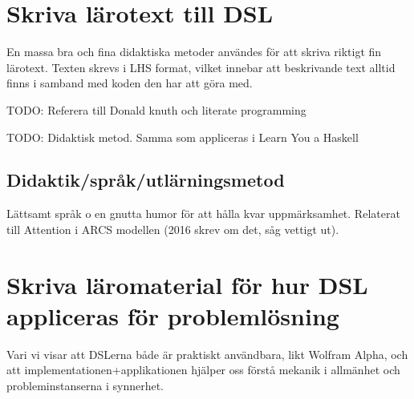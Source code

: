 \begin{binge}
  \section{Skriva lärotext till DSL}

  En massa bra och fina didaktiska metoder användes för att skriva
  riktigt fin lärotext. Texten skrevs i LHS format, vilket innebar att
  beskrivande text alltid finns i samband med koden den har att göra
  med.

  TODO: Referera till Donald knuth och literate programming

  TODO: Didaktisk metod. Samma som appliceras i Learn You a Haskell

  \subsection{Didaktik/språk/utlärningsmetod}

  Lättsamt språk o en gnutta humor för att hålla kvar
  uppmärksamhet. Relaterat till Attention i ARCS modellen (2016 skrev om
  det, såg vettigt ut).

  \section{Skriva läromaterial för hur DSL appliceras för problemlösning}

  Vari vi visar att DSLerna både är praktiskt användbara, likt Wolfram
  Alpha, och att implementationen+applikationen hjälper oss förstå
  mekanik i allmänhet och probleminstanserna i synnerhet.

\end{binge}

